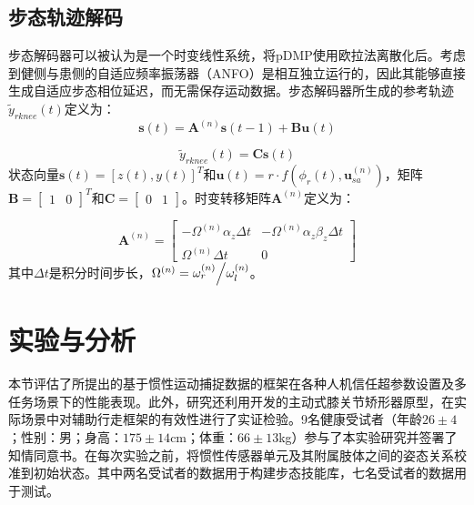 \subsection{步态轨迹解码}步态解码器可以被认为是一个时变线性系统，将pDMP使用欧拉法离散化后。考虑到健侧与患侧的自适应频率振荡器（ANFO）是相互独立运行的，因此其能够直接生成自适应步态相位延迟，而无需保存运动数据。步态解码器所生成的参考轨迹${{\tilde y}_{rknee}}(t)$定义为：
\begin{equation}
  \label{deqn_ex19}
  \pmb{s}(t) = {{\boldsymbol{A}}^{(n)}}\pmb{s}(t - 1) + {\boldsymbol{B}}\pmb{u}(t)
\end{equation}

\begin{equation}
  \label{deqn_ex20}
  {{\tilde y}_{rknee}}(t) = {\boldsymbol{C}}\pmb{s}(t)
\end{equation}    
状态向量$\pmb{s}(t)={\left[ {z(t),y(t)} \right]^T}$和${\pmb{u}}(t)=r \cdot f({\phi _r}(t),{\pmb{u}}_{sa}^{(n)})$，矩阵${\boldsymbol{B}={\left[ {\begin{array}{*{20}{c}}1&0 \end{array}} \right]^T}}$和${\boldsymbol{C}=\left[{\begin{array}{*{20}{c}}0&1 \end{array}} \right]}$。时变转移矩阵${{\boldsymbol{A}}^{(n)}}$定义为：

\[{{\boldsymbol{A}}^{(n)}} = \left[ {\begin{array}{*{20}{c}}
{ - {\Omega ^{(n)}}{\alpha _z}\Delta t}&{ - {\Omega ^{(n)}}{\alpha _z}{\beta _z}\Delta t}  \\  
{{\Omega ^{(n)}}\Delta t}&0 
\end{array}} \right]\]    
其中$\Delta t$是积分时间步长，${\Omega ^{(n)}} = {{\omega _r^{(n)}} \mathord{\left/{\vphantom {{\omega _r^{(n)}} {\omega _l^{(n)}}}} \right.\kern-\nulldelimiterspace} {\omega _l^{(n)}}}$。

\section{实验与分析}本节评估了所提出的基于惯性运动捕捉数据的框架在各种人机信任超参数设置及多任务场景下的性能表现。此外，研究还利用开发的主动式膝关节矫形器原型，在实际场景中对辅助行走框架的有效性进行了实证检验。9名健康受试者（年龄$26\pm 4$；性别：男；身高：$175\pm 14$cm；体重：$66\pm13$kg）参与了本实验研究并签署了知情同意书。在每次实验之前，将惯性传感器单元及其附属肢体之间的姿态关系校准到初始状态\cite{tongLSTMBasedLowerLimbs2020}。其中两名受试者的数据用于构建步态技能库，七名受试者的数据用于测试。  

